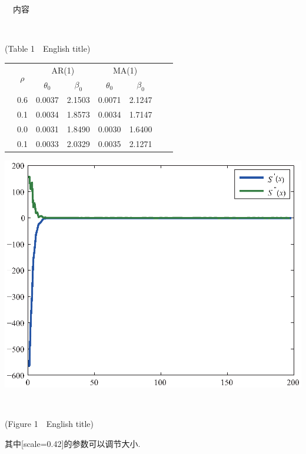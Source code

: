 \documentclass{jssms}
\numberwithin{equation}{section}
\begin{document}
\ \   内容  
\begin{center}\tabcolsep 2pt %
    \\
    \centerline{\small (Table 1\ \ English title)}%
\vskip 1mm
{\small
\setlength{\tabcolsep}{5pt}  %
\renewcommand{\arraystretch}{1.0}%
    \begin{tabular*}{6.5cm}{cccccccc}
        \hline
        &\multirow{2}{*}{$\rho$}   &\multicolumn{2}{c}{AR(1)} &   \multicolumn{2}{c}{MA(1)} &    \\

\cmidrule(r){3-4}\cmidrule(r){5-6}
                 &           & $\theta_{0}$ & $\beta_{0}$ & $\theta_{0}$ & $\beta_{0}$   \\
        \hline
            &0.6   &0.0037    &2.1503    &0.0071    &2.1247   \\
            &0.1   &0.0034    &1.8573    &0.0034    &1.7147   \\
            & 0.0   &0.0031    &1.8490    &0.0030    &1.6400   \\
            & 0.1   &0.0033    &2.0329    &0.0035    &2.1271   \\
      \hline
    \end{tabular*}}
\end{center}

\begin{center}
\centerline
  {\includegraphics[scale=0.3]{1.eps}}%
\\
 \centerline{\small (Figure 1\ \ English title)}%
\end{center}
其中[scale=0.42]的参数可以调节大小.
\end{document}
